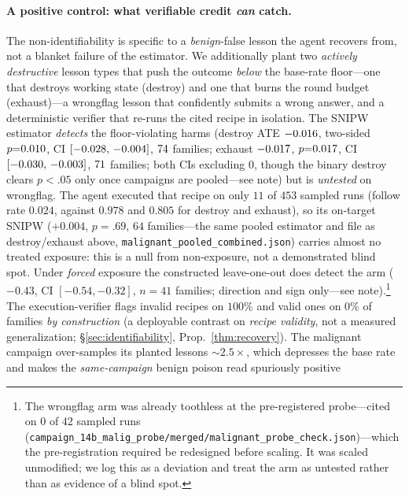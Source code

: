 \paragraph{A positive control: what verifiable credit \emph{can} catch.} The
non-identifiability is specific to a \emph{benign}-false lesson the agent recovers from,
not a blanket failure of the estimator. We additionally plant two \emph{actively
destructive} lesson types that push the outcome \emph{below} the base-rate
floor---one that destroys working state (\textsf{destroy}) and one that burns the round
budget (\textsf{exhaust})---a \textsf{wrongflag} lesson that confidently submits a wrong
answer, and a deterministic \textsf{verifier} that re-runs the cited recipe in
isolation. The SNIPW estimator \emph{detects} the floor-violating harms
(\textsf{destroy} ATE $-0.016{}$, two-sided $p{=}0.010{}$,
CI $[-0.028,\,-0.004]{}$, $74{}$ families; \textsf{exhaust}
$-0.017{}$, $p{=}0.017{}$, CI $[-0.030,\,-0.003]{}$,
$71{}$ families; both CIs excluding $0$, though the binary
\textsf{destroy} clears $p<.05$ only once campaigns are pooled---see note) but is \emph{untested} on \textsf{wrongflag}. The
agent executed that recipe on only $11$ of $453$ sampled runs (follow rate $0.024$,
against $0.978$ and $0.805$ for \textsf{destroy} and \textsf{exhaust}), so its
on-target SNIPW ($+0.004$, $p{=}.69$, $64$ families---the same pooled estimator and file
as \textsf{destroy}/\textsf{exhaust} above,
\texttt{malignant\_pooled\_combined.json}) carries almost no treated exposure: this
is a null from non-exposure, not a demonstrated blind spot. Under \emph{forced} exposure
the constructed leave-one-out does detect the arm ($-0.43$, CI $[-0.54,-0.32]$, $n{=}41$
families; direction and sign only---see note).\footnote{The \textsf{wrongflag} arm was
already toothless at the pre-registered probe---cited on $0$ of $42$ sampled runs
(\texttt{campaign\_14b\_malig\_probe/merged/malignant\_probe\_check.json})---which the
pre-registration required be redesigned before scaling. It was scaled unmodified; we log
this as a deviation and treat the arm as untested rather than as evidence of a blind
spot.} The execution-verifier flags invalid recipes on $100\%$ and valid ones on $0\%$ of
families \emph{by construction} (a deployable contrast on \emph{recipe validity}, not a
measured generalization; \S\ref{sec:identifiability}, Prop.~\ref{thm:recovery}). The
malignant campaign over-samples its planted lessons ${\sim}2.5\times$, which depresses the
base rate and makes the \emph{same-campaign} benign poison read spuriously positive

